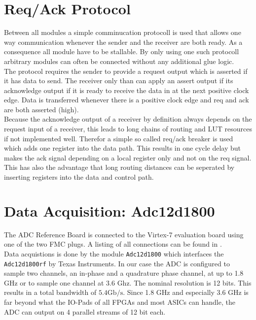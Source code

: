 \section{Req/Ack Protocol}
\label{sec:fpga_reqack}
Between all modules a simple comminucation protocoll is used that allows
one way communication whenever the sender and the receiver are both
ready. As a consequence all module have to be stallable. By only using
one such protocoll arbitrary modules can often be connected
without any additional glue logic. \\

The protocol requires the sender to provide a request output which
is asserted if it has data to send. The receiver only than can apply
an assert output if its acknowledge output if it is ready to receive
the data in at the next positive clock edge. Data is transferred whenever
there is a positive clock edge and req and ack are both asserted (high). \\

Because the acknowledge output of a receiver by definition always depends on the
request input of a receiver, this leads to long chains of routing and
\gls{LUT} resources if not implemented well. Therefor a simple so called
req/ack breaker is used which adds one register into the data path. This results
in one cycle delay but makes the ack signal depending on a local register
only and not on the req signal. \\

This has also the advantage that long routing distances can be seperated by inserting
registers into the data and control path.


\section{Data Acquisition: Adc12d1800}
\label{sec:fpga_adc}

The \gls{ADC} Reference Board is connected to the Virtex-7 evaluation board using 
one of the two \gls{FMC} plugs. A listing of all connections can be found in
. \\

Data acquistions is done by the module \verb|Adc12d1800| which interfaces
the \verb|Adc12d1800rf| by Texas Instruments. In our case the ADC is configured
to sample two channels, an in-phase and a quadrature phase channel, at up to 1.8 GHz
or to sample one channel at 3.6 Ghz. The nominal resolution is 12 bits.
This results in a total bandwidth of $5.4 \text{Gb}/\text{s}$.
Since 1.8 GHz and especially 3.6 GHz is far beyond what the IO-Pads of all
\glspl{FPGA}  and most \glspl{ASIC} can handle,
the ADC can output on 4 parallel streams of 12 bit each. \\

